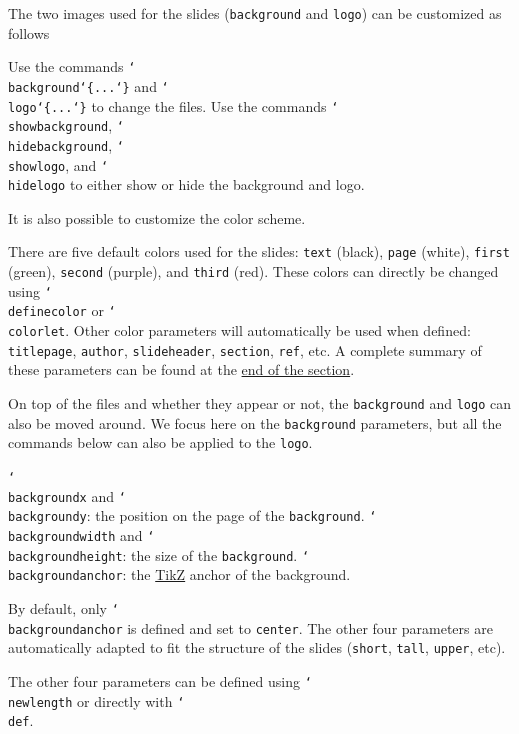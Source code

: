 \documentclass{slixte}
\newcommand{\codetext}[1]{\texttt{\color{second}#1}}
\newcommand{\cmdt}[1]{\char`\\#1}
\newcommand{\cbrl}{\char`\{}
\newcommand{\cbrr}{\char`\}}
\newcommand{\cbrt}[1]{\cbrl#1\cbrr}
\newcommand{\tikzref}{\href{https://en.wikipedia.org/wiki/PGF/TikZ}{\color{first}TikZ}}
\begin{document}
\begin{slide}
    The two images used for the slides (\codetext{background} and \codetext{logo}) can be customized as follows
    \begin{itemize}
        \fillitem Use the commands \codetext{\cmdt{background}\cbrt{...}} and \codetext{\cmdt{logo}\cbrt{...}} to change the files.
        \fillitem Use the commands \codetext{\cmdt{showbackground}}, \codetext{\cmdt{hidebackground}}, \codetext{\cmdt{showlogo}}, and \codetext{\cmdt{hidelogo}} to either show or hide the background and logo.
    \end{itemize}

    \spacing

    It is also possible to customize the color scheme.
    \begin{itemize}
        \fillitem There are five default colors used for the slides: \codetext{text} (black), \codetext{page} (white), \codetext{first} (green), \codetext{second} (purple), and \codetext{third} (red).
        \fillitem These colors can directly be changed using \codetext{\cmdt{definecolor}} or \codetext{\cmdt{colorlet}}.
        \fillitem Other color parameters will automatically be used when defined: \codetext{titlepage}, \codetext{author}, \codetext{slideheader}, \codetext{section}, \codetext{ref}, etc. A complete summary of these parameters can be found at the \hyperlink{custom:summary}{\color{first}end of the section}.
    \end{itemize}
\end{slide}

\hypertarget{custom:design}{}
\begin{slide}
    On top of the files and whether they appear or not, the \codetext{background} and \codetext{logo} can also be moved around.
    We focus here on the \codetext{background} parameters, but all the commands below can also be applied to the \codetext{logo}.
    \begin{itemize}
        \fillitem \codetext{\cmdt{backgroundx}} and \codetext{\cmdt{backgroundy}}: the position on the page of the \codetext{background}.
        \fillitem \codetext{\cmdt{backgroundwidth}} and \codetext{\cmdt{backgroundheight}}: the size of the \codetext{background}.
        \fillitem \codetext{\cmdt{backgroundanchor}}: the \tikzref{} anchor of the background.
    \end{itemize}

    \spacing[1]

    \begin{remark}
        By default, only \codetext{\cmdt{backgroundanchor}} is defined and set to \codetext{center}.
        The other four parameters are automatically adapted to fit the structure of the slides (\codetext{short}, \codetext{tall}, \codetext{upper}, etc).

        The other four parameters can be defined using \codetext{\cmdt{newlength}} or directly with \codetext{\cmdt{def}}.
    \end{remark}
\end{slide}
\end{document}
